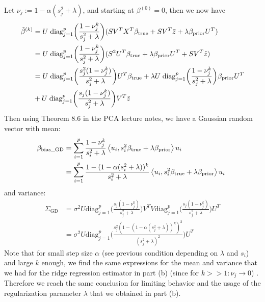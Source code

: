 \documentclass[12pt,twoside]{article}
\begin{document}
\begin{enumerate}
Let $\nu_j := 1 - \alpha (s_j^2 + \lambda)$, and starting at $\beta^{(0)}=0$, then we now have
\begin{align*}
	\tilde{ \beta }^{(k)} 	&= 	 U \;    \text{diag}_{j=1}^p \bigg(  \frac{ 1 - \nu_j^k} {s_j^2 + \lambda}  \bigg) (S V^T X^T  \beta_{\operatorname{true}}  + S V^T  \tilde{ z } +  \lambda \beta_{\operatorname{prior}}  U^T)\\
					&=	 U \;    \text{diag}_{j=1}^p \bigg(  \frac{ 1 - \nu_j^k} {s_j^2 + \lambda}  \bigg) (S^2 U^T  \beta_{\operatorname{true}}  +  \lambda \beta_{\operatorname{prior}}  U^T  + S V^T  \tilde{ z }) \\	
					&=	 U \;    \text{diag}_{j=1}^p \bigg(  \frac{s_j^2  (1 - \nu_j^k)} {s_j^2 + \lambda} \bigg) U^T \beta_{\operatorname{true}}  + \lambda U \;    \text{diag}_{j=1}^p \bigg(  \frac{1 - \nu_j^k} {s_j^2 + \lambda} \bigg) \beta_{\operatorname{prior}} U^T \\
					&+  	 U \;    \text{diag}_{j=1}^p \bigg(  \frac{ s_j  (1 - \nu_j^k)} {s_j^2 + \lambda} \bigg) V^T  \tilde{ z } 
\end{align*}	
 Then using Theorem 8.6 in the PCA lecture notes, we have a Gaussian random vector  with mean:
\begin{align*}
	\beta_{\text{bias\_GD}} 	&= \sum_{i=1}^p \frac{1 - \nu_j^k}{s_i^2 + \lambda} \left \langle u_i, s_i^2 \beta_{\operatorname{true}}+ \lambda  \beta_{\operatorname{prior}} \right \rangle u_i \\
						&= \sum_{i=1}^p \frac{1 - (1 - \alpha (s_i^2 + \lambda))^k} {s_i^2 + \lambda} \left \langle u_i, s_i^2 \beta_{\operatorname{true}}+ \lambda  \beta_{\operatorname{prior}} \right \rangle u_i \
\end{align*}
and variance:
\begin{align*} 
	\Sigma_{\text{GD}}			&= \sigma^2 U  \text{diag}_{j=1}^p \bigg(  \frac{ s_j  (1 - \nu_j^k)} {s_j^2 + \lambda} \bigg) V^T V  \text{diag}_{j=1}^p \bigg(  \frac{ s_j  (1 - \nu_j^k)} {s_j^2 + \lambda} \bigg) U^T \\
							&= \sigma^2 U  \text{diag}_{j=1}^p \bigg(  \frac{ s_j^2  (1 - (1 - \alpha (s_j^2 + \lambda))^k)^2} {(s_j^2 + \lambda)^2} \bigg) U^T
\end{align*}
 Note that for small step size $\alpha$ (see previous condition depending on $\lambda$ and $s_i$) and large $k$  enough, 
 we find the same expressions for the mean and variance that we had  for the ridge regression estimator in part (b) (since for $k >> 1: \nu_j \rightarrow 0$) .
 Therefore  we reach the same conclusion for limiting behavior and the usage of the regularization parameter $\lambda$ that we obtained in part (b).
 \end{enumerate}
\end{document}
